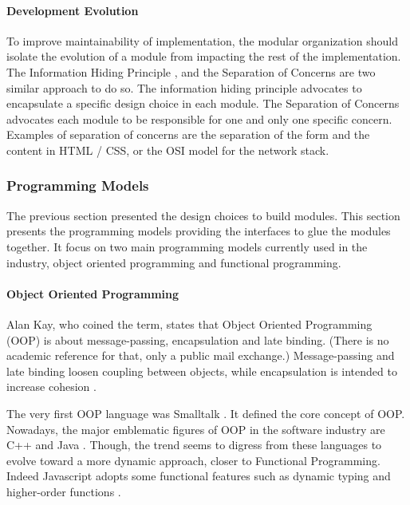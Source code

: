 \paragraph{Development Evolution}

To improve maintainability of implementation, the modular organization should isolate the evolution of a module from impacting the rest of the implementation.
The Information Hiding Principle \cite{Parnas1972}, and the Separation of Concerns \cite{Tarr1999,Hursch1995} are two similar approach to do so.
The information hiding principle advocates to encapsulate a specific design choice in each module.
The Separation of Concerns advocates each module to be responsible for one and only one specific concern.
Examples of separation of concerns are the separation of the form and the content in HTML / CSS, or the OSI model for the network stack.

\subsubsection{Programming Models} \label{chapter3:software-design:programming-models}

The previous section presented the design choices to build modules.
This section presents the programming models providing the interfaces to glue the modules together.
It focus on two main programming models currently used in the industry, object oriented programming and functional programming.

\paragraph{Object Oriented Programming}


Alan Kay, who coined the term, states that Object Oriented Programming (OOP) is about message-passing, encapsulation and late binding.
(There is no academic reference for that, only a public mail exchange.)
Message-passing and late binding loosen coupling between objects, while encapsulation is intended to increase cohesion .

The very first OOP language was Smalltalk \cite{Goldberg1984}.
It defined the core concept of OOP.
Nowadays, the major emblematic figures of OOP in the software industry are C++ and Java \cite{Gosling2000,Stroustrup1986}.
Though, the trend seems to digress from these languages to evolve toward a more dynamic approach, closer to Functional Programming.
Indeed Javascript adopts some functional features such as dynamic typing and higher-order functions \cite{Ecma1999}.


